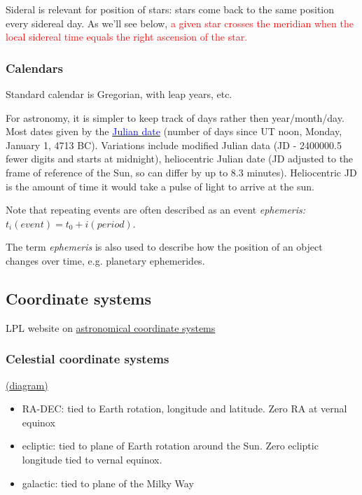 \documentclass{article}
\begin{document}
Sideral is relevant for position of stars: stars come back
to the same position every sidereal day. As we'll see
below, \textcolor{red}{a given star crosses the meridian when the
local sidereal time equals the right ascension of the
star.}

\subsubsection*{Calendars}

Standard calendar is Gregorian, with leap years, etc.

For astronomy, it is simpler to keep track of days rather
    then year/month/day. Most dates given by the
    \href{https://en.wikipedia.org/wiki/Julian_day}
    {\textcolor{blue}{Julian date}}
    (number of days since UT noon, Monday,
    January 1, 4713 BC). Variations include modified Julian
    data (JD - 2400000.5 fewer digits and starts at midnight),
    heliocentric Julian date (JD adjusted to the frame of
    reference of the Sun, so can differ by up to 8.3 minutes).
    Heliocentric JD is the amount of time it would take a
    pulse of light to arrive at the sun.

Note that repeating events are often described as an event
    \emph{ephemeris:} $t_i(event) = t_0 + i(period)$.

The term \emph{ephemeris} is also used to describe how the
    position of an object changes over time, e.g. planetary
    ephemerides.

\subsection*{Coordinate systems}
LPL website on \textcolor{blue}
{\href{http://spider.seds.org/spider/ScholarX/coords.html}
{astronomical coordinate systems}}
\subsubsection*{Celestial coordinate systems}
\textcolor{blue}
{\href{http://csep10.phys.utk.edu/astr161/lect/time/coordinates.html}{(diagram)}}
\begin{itemize}
    \item RA-DEC: tied to Earth rotation, longitude and latitude.
        Zero RA at vernal equinox
    \item ecliptic: tied to plane of Earth rotation around the Sun.
        Zero ecliptic longitude tied to vernal equinox.
    \item galactic: tied to plane of the Milky Way
\end{itemize}
\end{document}
